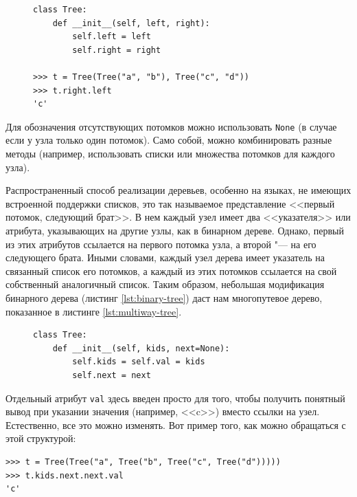 \begin{figure}[h!]
\begin{lstlisting}[caption={Класс бинарного дерева и его использование}, label={lst:binary-tree}]
class Tree:
	def __init__(self, left, right):
		self.left = left
		self.right = right

>>> t = Tree(Tree("a", "b"), Tree("c", "d"))
>>> t.right.left
'c'
\end{lstlisting}
\end{figure}
Для обозначения отсутствующих потомков можно использовать \texttt{None} (в случае если у узла только один потомок). Само собой, можно комбинировать разные методы (например, использовать списки или множества потомков для каждого узла).

Распространенный способ реализации деревьев, особенно на языках, не имеющих встроенной поддержки списков, это так называемое представление <<первый потомок, следующий брат>>. В нем каждый узел имеет два <<указателя>> или атрибута, указывающих на другие узлы, как в бинарном дереве. Однако, первый из этих атрибутов ссылается на первого потомка узла, а второй "--- на его следующего брата. Иными словами, каждый узел дерева имеет указатель на связанный список его потомков, а каждый из этих потомков ссылается на свой собственный аналогичный список. Таким образом, небольшая модификация бинарного дерева (листинг \ref{lst:binary-tree}) даст нам многопутевое дерево, показанное в листинге \ref{lst:multiway-tree}.

\begin{figure}[h]
\begin{lstlisting}[caption={Класс многопутевого дерева}, label={lst:multiway-tree}]
class Tree:
	def __init__(self, kids, next=None):
		self.kids = self.val = kids
		self.next = next
\end{lstlisting}
\end{figure}

Отдельный атрибут \texttt{val} здесь введен просто для того, чтобы получить понятный вывод при указании значения (например, <<c>>) вместо ссылки на узел. Естественно, все это можно изменять. Вот пример того, как можно обращаться с этой структурой:
\begin{lstlisting}
>>> t = Tree(Tree("a", Tree("b", Tree("c", Tree("d")))))
>>> t.kids.next.next.val
'c'
\end{lstlisting}

